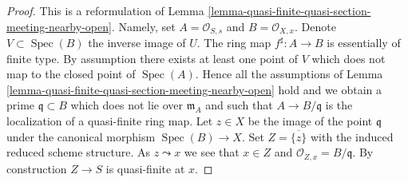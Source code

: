 \documentclass[10pt,a4paper]{amsart}
\theoremstyle{plain}
\theoremstyle{definition}
\theoremstyle{remark}
\numberwithin{equation}{subsection}
\def\Spec{\mathop{\mathrm{Spec}}}
\begin{document}
\begin{proof}
This is a reformulation of
Lemma \ref{lemma-quasi-finite-quasi-section-meeting-nearby-open}.
Namely, set $A = \mathcal{O}_{S, s}$ and $B = \mathcal{O}_{X, x}$.
Denote $V \subset \Spec(B)$ the inverse image of $U$.
The ring map $f^\sharp : A \to B$ is essentially of finite type.
By assumption there exists at least one point of $V$ which does not
map to the closed point of $\Spec(A)$. Hence all the assumptions of
Lemma \ref{lemma-quasi-finite-quasi-section-meeting-nearby-open}
hold and we obtain a prime $\mathfrak q \subset B$ which does not
lie over $\mathfrak m_A$ and such that $A \to B/\mathfrak q$ is
the localization of a quasi-finite ring map. Let $z \in X$ be the
image of the point $\mathfrak q$ under the canonical
morphism $\Spec(B) \to X$. Set $Z = \overline{\{z\}}$
with the induced reduced scheme structure. As $z \leadsto x$
we see that $x \in Z$ and $\mathcal{O}_{Z, x} = B/\mathfrak q$.
By construction $Z \to S$ is quasi-finite at $x$.
\end{proof}
\end{document}
